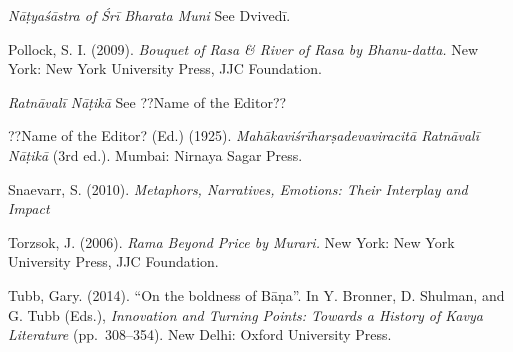 \begin{thebibliography}{99}
\textsl{Nāṭyaśāstra of Śrī Bharata Muni} See Dvivedī.

Pollock, S. I. (2009). \textsl{Bouquet of Rasa \& River of Rasa by Bhanu-datta.} New York: New York University Press, JJC Foundation.

\textsl{Ratnāvalī Nāṭikā} See ??Name of the Editor??

??Name of the Editor? (Ed.) (1925). \textsl{Mahākaviśrīharṣadevaviracitā Ratnāvalī Nāṭikā} (3rd ed.). Mumbai: Nirnaya Sagar Press.

Snaevarr, S. (2010). \textsl{Metaphors, Narratives, Emotions: Their Interplay and Impact}

Torzsok, J. (2006). \textsl{Rama Beyond Price by Murari.} New York: New York University Press, JJC Foundation.

Tubb, Gary. (2014). “On the boldness of Bāṇa”. In Y. Bronner, D. Shulman, and G. Tubb (Eds.), \textsl{Innovation and Turning Points: Towards a History of Kavya Literature} (pp.~308--354). New Delhi: Oxford University Press.
\end{thebibliography}

\theendnotes
